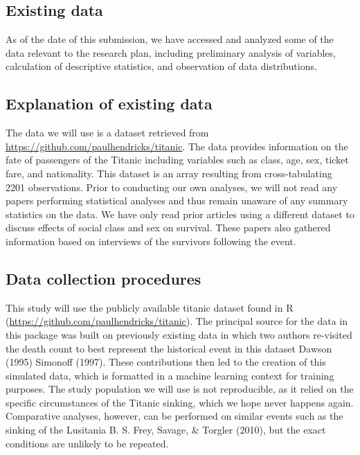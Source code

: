 \documentclass[]{article}
\begin{document}
\hypertarget{existing-data}{%
\subsection{Existing data}\label{existing-data}}

As of the date of this submission, we have accessed and analyzed some of
the data relevant to the research plan, including preliminary analysis
of variables, calculation of descriptive statistics, and observation of
data distributions.

\hypertarget{explanation-of-existing-data}{%
\subsection{Explanation of existing
data}\label{explanation-of-existing-data}}

The data we will use is a dataset retrieved from
\url{https://github.com/paulhendricks/titanic}. The data provides
information on the fate of passengers of the Titanic including variables
such as class, age, sex, ticket fare, and nationality. This dataset is
an array resulting from cross-tabulating 2201 observations. Prior to
conducting our own analyses, we will not read any papers performing
statistical analyses and thus remain unaware of any summary statistics
on the data. We have only read prior articles using a different dataset
to discuss effects of social class and sex on survival. These papers
also gathered information based on interviews of the survivors following
the event.

\hypertarget{data-collection-procedures}{%
\subsection{Data collection
procedures}\label{data-collection-procedures}}

This study will use the publicly available titanic dataset found in R
(\url{https://github.com/paulhendricks/titanic}). The principal source
for the data in this package was built on previously existing data in
which two authors re-visited the death count to best represent the
historical event in this dataset Dawson (1995) Simonoff (1997). These
contributions then led to the creation of this simulated data, which is
formatted in a machine learning context for training purposes. The study
population we will use is not reproducible, as it relied on the specific
circumstances of the Titanic sinking, which we hope never happens again.
Comparative analyses, however, can be performed on similar events such
as the sinking of the Lusitania B. S. Frey, Savage, \& Torgler (2010),
but the exact conditions are unlikely to be repeated.
\end{document}
